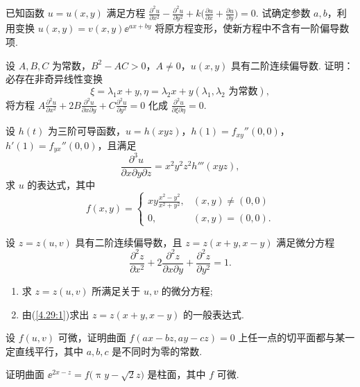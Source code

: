 	\begin{ti}
		已知函数 $u = u(x,y)$ 满足方程 $\frac{\partial^{2}u}{\partial x^{2}} - \frac{\partial^{2}u}{\partial y^{2}} + k \bigl( \frac{\partial u}{\partial x} + \frac{\partial u}{\partial y} \bigr) = 0$. 试确定参数 $a,b$，利用变换 $u(x,y) = v(x,y) \ee^{ax + by}$ 将原方程变形，使新方程中不含有一阶偏导数项.
	\end{ti}

	\begin{ti}
		设 $A,B,C$ 为常数，$B^{2} - AC > 0$，$A \ne 0$，$u(x,y)$ 具有二阶连续偏导数. 证明：必存在非奇异线性变换
		\[
			\xi = \lambda_{1}x + y, \eta = \lambda_{2}x + y(\lambda_{1},\lambda_{2} \text{ 为常数}),
		\]
		将方程 $A \frac{\partial^{2}u}{\partial x^{2}} + 2B \frac{\partial^{2}u}{\partial x \partial y} + C \frac{\partial^{2}u}{\partial y^{2}} = 0$ 化成 $\frac{\partial^{2}u}{\partial \xi \partial \eta} = 0$.
	\end{ti}

	\begin{ti}
		设 $h(t)$ 为三阶可导函数，$u = h(xyz)$，$h(1) = f_{xy}''(0,0)$，$h'(1) = f_{yx}''(0,0)$，且满足
		\[
			\frac{\partial^{3}u}{\partial x \partial y \partial z} = x^{2} y^{2} z^{2} h'''(xyz),
		\]
		求 $u$ 的表达式，其中
		\[
			f(x,y) = \begin{cases}
				x y \frac{x^{2} - y^{2}}{x^{2} + y^{2}}, & (x,y) \ne (0,0)\\
				0, & (x,y) = (0,0).
			\end{cases}
		\]
	\end{ti}

	\begin{ti}
		设 $z = z(u,v)$ 具有二阶连续偏导数，且 $z = z(x + y, x - y)$ 满足微分方程
		\[
			\frac{\partial^{2}z}{\partial x^{2}} + 2 \frac{\partial^{2}z}{\partial x \partial y} + \frac{\partial^{2}z}{\partial y^{2}} = 1.
		\]
		\begin{enumerate}
			\item 求 $z = z(u,v)$ 所满足关于 $u,v$ 的微分方程;\label{4.29:1}
			\item 由(\ref{4.29:1})求出 $z = z(x + y, x - y)$ 的一般表达式.
		\end{enumerate}
	\end{ti}

	\begin{ti}
		设 $f(u,v)$ 可微，证明曲面 $f(ax - bz, ay - cz) = 0$ 上任一点的切平面都与某一定直线平行，其中 $a,b,c$ 是不同时为零的常数.
	\end{ti}

	\begin{ti}
		证明曲面 $\ee^{2x - z} = f \bigl( \uppi y - \sqrt{2}z \bigr)$ 是柱面，其中 $f$ 可微.
	\end{ti}